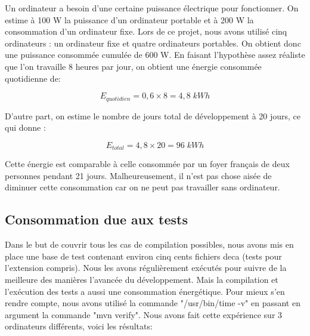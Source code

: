 \documentclass[12pt, a4paper, one side]{article}
\begin{document}
Un ordinateur a besoin d'une certaine puissance électrique pour fonctionner. On estime à 100 W la puissance d'un ordinateur portable et à 200 W la consommation d'un ordinateur fixe. Lors de ce projet, nous avons utilisé cinq ordinateurs : un ordinateur fixe et quatre ordinateurs portables. On obtient donc une puissance consommée cumulée de 600 W. En faisant l'hypothèse assez réaliste que l'on travaille 8 heures par jour, on obtient une énergie consommée quotidienne de:

\begin{equation}
E_{quotidien}=0,6\times 8 = 4,8\; kWh
\end{equation}

D'autre part, on estime le nombre de jours total de développement à 20 jours, ce qui donne :

\begin{equation}
E_{total}=4,8\times 20 = 96\; kWh
\end{equation}


Cette énergie est comparable à celle consommée par un foyer français de deux personnes pendant 21 jours. Malheureusement, il n'est pas chose aisée de diminuer cette consommation car on ne peut pas travailler sans ordinateur.

\subsection{Consommation due aux tests}

Dans le but de couvrir tous les cas de compilation possibles, nous avons mis en place une base de test contenant environ cinq cents fichiers deca (tests pour l’extension compris). Nous les avons régulièrement exécutés pour suivre de la meilleure des manières l'avancée du développement. Mais la compilation et l'exécution des tests a aussi une consommation énergétique. Pour mieux s'en rendre compte, nous avons utilisé la commande "/usr/bin/time -v" en passant en argument la commande "mvn verify". Nous avons fait cette expérience sur 3 ordinateurs différents, voici les résultats:
\end{document}
